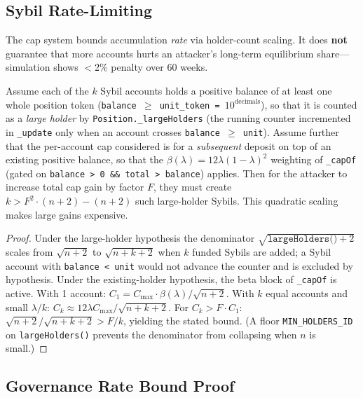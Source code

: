 \documentclass[10pt,a4paper,twocolumn]{article}
\begin{document}
\subsection{Sybil Rate-Limiting}

\begin{definition}
\label{def:sybil-scope}
The cap system bounds accumulation \emph{rate} via holder-count scaling. It does \textbf{not} guarantee that more accounts hurts an attacker's long-term equilibrium share---simulation shows $<$2\% penalty over 60 weeks.
\end{definition}

\begin{theorem}
\label{thm:sybil-cost}
Assume each of the $k$ Sybil accounts holds a positive balance of at least one whole position token (\texttt{balance $\geq$ unit\_token = $10^{\text{decimals}}$}), so that it is counted as a \emph{large holder} by \texttt{Position.\_largeHolders} (the running counter incremented in \texttt{\_update} only when an account crosses \texttt{balance $\geq$ unit}). Assume further that the per-account cap considered is for a \emph{subsequent} deposit on top of an existing positive balance, so that the $\beta(\lambda) = 12\lambda(1{-}\lambda)^2$ weighting of \texttt{\_capOf} (gated on \texttt{balance > 0 \&\& total > balance}) applies. Then for the attacker to increase total cap gain by factor $F$, they must create $k > F^2 \cdot (n{+}2) - (n{+}2)$ such large-holder Sybils. This quadratic scaling makes large gains expensive.
\end{theorem}

\begin{proof}
Under the large-holder hypothesis the denominator $\sqrt{\texttt{largeHolders()}+2}$ scales from $\sqrt{n+2}$ to $\sqrt{n+k+2}$ when $k$ funded Sybils are added; a Sybil account with \texttt{balance < unit} would not advance the counter and is excluded by hypothesis. Under the existing-holder hypothesis, the beta block of \texttt{\_capOf} is active. With 1 account: $C_1 = C_{\max} \cdot \beta(\lambda) / \sqrt{n{+}2}$. With $k$ equal accounts and small $\lambda/k$: $C_k \approx 12\lambda C_{\max}/\sqrt{n{+}k{+}2}$. For $C_k > F \cdot C_1$: $\sqrt{n{+}2}/\sqrt{n{+}k{+}2} > F/k$, yielding the stated bound. (A floor \texttt{MIN\_HOLDERS\_ID} on \texttt{largeHolders()} prevents the denominator from collapsing when $n$ is small.)
\end{proof}

\subsection{Governance Rate Bound Proof}
\end{document}
